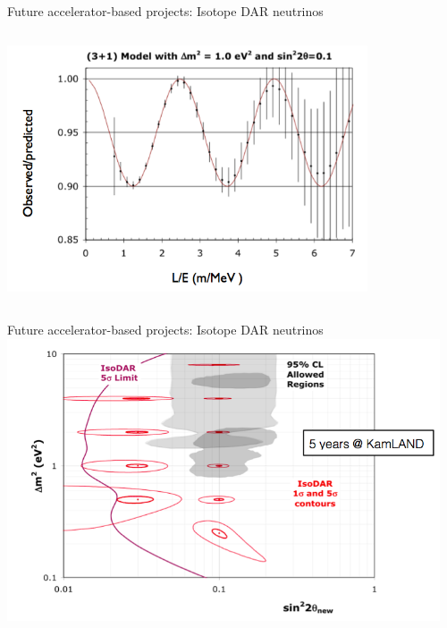 \begin{frame}[t]{Future accelerator-based projects: Isotope DAR neutrinos}
\begin{columns}
\begin{column}{0.50\textwidth}
     \includegraphics[width=0.80\textwidth]{./images/beyond3nu/future/isodar_wiggles.png}
  \end{column}
\end{columns}
\end{frame}

\begin{frame}[t]{Future accelerator-based projects: Isotope DAR neutrinos}
\centering
\includegraphics[width=0.96\textwidth]{./images/beyond3nu/future/isodar_sensitivity.png}
\end{frame}


